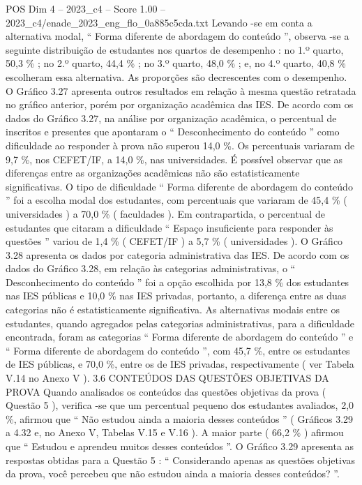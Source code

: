 \begin{textsample}{POS Dim 4 – 2023\_c4 – Score 1.00 – 2023\_c4/enade\_2023\_eng\_flo\_0a885c5cda.txt}
Levando -se em conta a alternativa modal, “ Forma diferente de abordagem do conteúdo ”, observa -se a seguinte distribuição de estudantes nos quartos de desempenho : no 1.º quarto, 50,3 \% ; no 2.º quarto, 44,4 \% ; no 3.º quarto, 48,0 \% ; e, no 4.º quarto, 40,8 \% escolheram essa alternativa.
As proporções são decrescentes com o desempenho.
O Gráfico 3.27 apresenta outros resultados em relação à mesma questão retratada no gráfico anterior, porém por organização acadêmica das IES.
De acordo com os dados do Gráfico 3.27, na análise por organização acadêmica, o percentual de inscritos e presentes que apontaram o “ Desconhecimento do conteúdo ” como dificuldade ao responder à prova não superou 14,0 \%.
Os percentuais variaram de 9,7 \%, nos CEFET/IF, a 14,0 \%, nas universidades.
É possível observar que as diferenças entre as organizações acadêmicas não são estatisticamente significativas.
O tipo de dificuldade “ Forma diferente de abordagem do conteúdo ” foi a escolha modal dos estudantes, com percentuais que variaram de 45,4 \% ( universidades ) a 70,0 \% ( faculdades ).
Em contrapartida, o percentual de estudantes que citaram a dificuldade “ Espaço insuficiente para responder às questões ” variou de 1,4 \% ( CEFET/IF ) a 5,7 \% ( universidades ).
O Gráfico 3.28 apresenta os dados por categoria administrativa das IES.
De acordo com os dados do Gráfico 3.28, em relação às categorias administrativas, o “ Desconhecimento do conteúdo ” foi a opção escolhida por 13,8 \% dos estudantes nas IES públicas e 10,0 \% nas IES privadas, portanto, a diferença entre as duas categorias não é estatisticamente significativa.
As alternativas modais entre os estudantes, quando agregados pelas categorias administrativas, para a dificuldade encontrada, foram as categorias “ Forma diferente de abordagem do conteúdo ” e “ Forma diferente de abordagem do conteúdo ”, com 45,7 \%, entre os estudantes de IES públicas, e 70,0 \%, entre os de IES privadas, respectivamente ( ver Tabela V.14 no Anexo V ). 3.6 CONTEÚDOS DAS QUESTÕES OBJETIVAS DA PROVA Quando analisados os conteúdos das questões objetivas da prova ( Questão 5 ), verifica -se que um percentual pequeno dos estudantes avaliados, 2,0 \%, afirmou que “ Não estudou ainda a maioria desses conteúdos ” ( Gráficos 3.29 a 4.32 e, no Anexo V, Tabelas V.15 e V.16 ).
A maior parte ( 66,2 \% ) afirmou que “ Estudou e aprendeu muitos desses conteúdos ”.
O Gráfico 3.29 apresenta as respostas obtidas para a Questão 5 : “ Considerando apenas as questões objetivas da prova, você percebeu que não estudou ainda a maioria desses conteúdos? ”.

\end{textsample}
